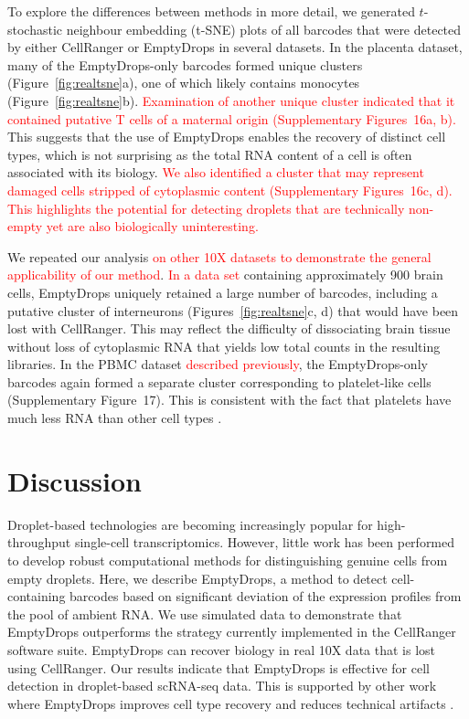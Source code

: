 \documentclass{bmcart}
\newcommand{\revised}[1]{\textcolor{red}{#1}}
\newcommand{\suppfigrealplacenta}{16}
\newcommand{\suppfigrealpbmc}{17}
\begin{document}
To explore the differences between methods in more detail, we generated $t$-stochastic neighbour embedding (t-SNE) plots \cite{van2008visualizing} of all barcodes that were detected by either CellRanger or EmptyDrops in several datasets.
In the placenta dataset, many of the EmptyDrops-only barcodes formed unique clusters (Figure~\ref{fig:realtsne}a), one of which likely contains monocytes (Figure~\ref{fig:realtsne}b).
\revised{Examination of another unique cluster indicated that it contained putative T cells of a maternal origin (Supplementary Figures~\suppfigrealplacenta{}a, b).}
This suggests that the use of EmptyDrops enables the recovery of distinct cell types, which is not surprising as the total RNA content of a cell is often associated with its biology.
\revised{We also identified a cluster that may represent damaged cells stripped of cytoplasmic content (Supplementary Figures~\suppfigrealplacenta{}c, d).
This highlights the potential for detecting droplets that are technically non-empty yet are also biologically uninteresting.}

We repeated our analysis \revised{on other 10X datasets to demonstrate the general applicability of our method}.
\revised{In a data set} containing approximately 900 brain cells, EmptyDrops uniquely retained a large number of barcodes, including a putative cluster of interneurons (Figures~\ref{fig:realtsne}c, d) that would have been lost with CellRanger.
This may reflect the difficulty of dissociating brain tissue without loss of cytoplasmic RNA \cite{habib2017massively} that yields low total counts in the resulting libraries.
In the PBMC dataset \revised{described previously}, the EmptyDrops-only barcodes again formed a separate cluster corresponding to platelet-like cells (Supplementary Figure~\suppfigrealpbmc{}).
This is consistent with the fact that platelets have much less RNA than other cell types \cite{rowley2012platelet}.

\section*{Discussion}
Droplet-based technologies are becoming increasingly popular for high-throughput single-cell transcriptomics.
However, little work has been performed to develop robust computational methods for distinguishing genuine cells from empty droplets.
Here, we describe EmptyDrops, a method to detect cell-containing barcodes based on significant deviation of the expression profiles from the pool of ambient RNA.
We use simulated data to demonstrate that EmptyDrops outperforms the strategy currently implemented in the CellRanger software suite.
EmptyDrops can recover biology in real 10X data that is lost using CellRanger.
Our results indicate that EmptyDrops is effective for cell detection in droplet-based scRNA-seq data.
This is supported by other work where EmptyDrops improves cell type recovery \cite{ernst2018staged} and reduces technical artifacts \cite{griffiths2018detection}.
\end{document}
